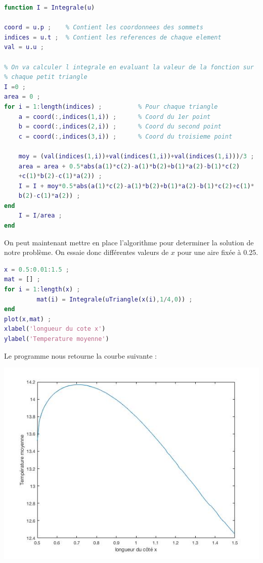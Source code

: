 \documentclass[a4paper,reqno]{article}
\begin{document}
\begin{lstlisting}[language=Matlab,frame=single,caption=Calcul de l'integrale]
function I = Integrale(u)

coord = u.p ;    % Contient les coordonnees des sommets 
indices = u.t ;  % Contient les references de chaque element
val = u.u ; 

% On va calculer l integrale en evaluant la valeur de la fonction sur
% chaque petit triangle 
I =0 ; 
area = 0 ; 
for i = 1:length(indices) ;          % Pour chaque triangle 
    a = coord(:,indices(1,i)) ;      % Coord du 1er point 
    b = coord(:,indices(2,i)) ;      % Coord du second point 
    c = coord(:,indices(3,i)) ;      % Coord du troisieme point
    
    moy = (val(indices(1,i))+val(indices(1,i))+val(indices(1,i)))/3 ;
    area = area + 0.5*abs(a(1)*c(2)-a(1)*b(2)+b(1)*a(2)-b(1)*c(2)
    +c(1)*b(2)-c(1)*a(2)) ; 
    I = I + moy*0.5*abs(a(1)*c(2)-a(1)*b(2)+b(1)*a(2)-b(1)*c(2)+c(1)*
    b(2)-c(1)*a(2)) ;
end
    I = I/area ; 
end
\end{lstlisting} 
On peut maintenant mettre en place l'algorithme pour determiner la solution de notre problème. On essaie donc différentes valeurs de $x$ pour une aire fixée à 0.25.
\begin{lstlisting}[language=Matlab,frame=single,caption=Script Principal]
% Script principal 
x = 0.5:0.01:1.5 ; 
mat = [] ; 
for i = 1:length(x) ;
         mat(i) = Integrale(uTriangle(x(i),1/4,0)) ;
end
plot(x,mat) ; 
xlabel('longueur du cote x')
ylabel('Temperature moyenne')
\end{lstlisting}
\vspace{0.5cm}
Le programme nous retourne la courbe suivante : \\
\begin{center}
\includegraphics[scale=0.5]{Triangle_CourbeX.jpg}
\end{center}
\newpage
\end{document}

